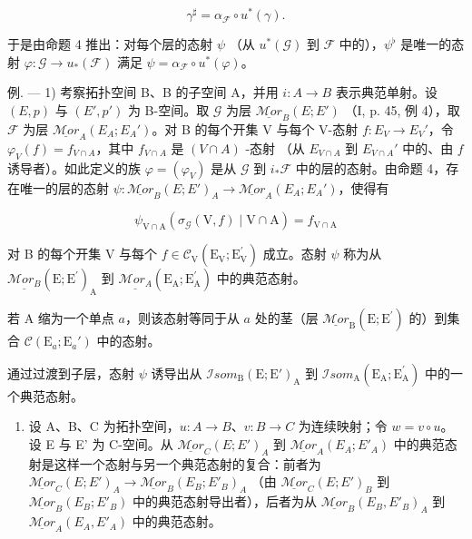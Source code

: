 \[
\gamma^ {\sharp} = \alpha_ {\mathcal {F}} \circ u ^ {*} (\gamma).
\]

于是由命题 4 推出：对每个层的态射 \(\psi\) （从 \(u^{*}(\mathcal{G})\) 到 \(\mathcal{F}\) 中的），\(\psi^{\flat}\) 是唯一的态射 \(\varphi\colon\mathcal{G}\to u_{*}(\mathcal{F})\) 满足 \(\psi=\alpha_{\mathcal{F}}\circ u^{*}(\varphi)\)。

例. --- 1) 考察拓扑空间 B、B 的子空间 A，并用 \(i\colon A \to B\) 表示典范单射。设 \((E,p)\) 与 \((E',p')\) 为 B-空间。取 \(\mathcal{G}\) 为层 \(\underline{\mathcal{M}or}_{B}(E;E')\) （I, p. 45, 例 4），取 \(\mathcal{F}\) 为层 \(\underline{\mathcal{M}or}_{A}(E_{A};E_{A}')\)。对 B 的每个开集 V 与每个 V-态射 \(f\colon E_{V} \to E_{V}'\)，令 \(\varphi_{V}(f) = f_{V \cap A}\)，其中 \(f_{V \cap A}\) 是 \((V \cap A)\) -态射 （从 \(E_{V \cap A}\) 到 \(E_{V \cap A}'\) 中的、由 \(f\) 诱导者）。如此定义的族 \(\varphi = (\varphi_{V})\) 是从 \(\mathcal{G}\) 到 \(i_*\mathcal{F}\) 中的层的态射。由命题 4，存在唯一的层的态射 \(\psi\colon \underline{\mathcal{M}or}_{B}(E;E')_{A} \to \underline{\mathcal{M}or}_{A}(E_{A};E_{A}')\)，使得有

\[
\psi_ {\mathrm{V} \cap \mathrm{A}} (\sigma_ {\mathcal {G}} (\mathrm{V}, f) \mid \mathrm{V} \cap \mathrm{A}) = f _ {\mathrm{V} \cap \mathrm{A}}\tag{12}
\]

对 B 的每个开集 V 与每个 \(f \in \mathcal{C}_{\mathrm{V}}(\mathrm{E}_{\mathrm{V}}; \mathrm{E}_{\mathrm{V}}^{\prime})\) 成立。态射 \(\psi\) 称为从 \(\underline{\mathcal{M}or_{B}}(\mathrm{E}; \mathrm{E}^{\prime})_{\mathrm{A}}\) 到 \(\underline{\mathcal{M}or_{A}}(\mathrm{E}_{\mathrm{A}}; \mathrm{E}_{\mathrm{A}}^{\prime})\) 中的典范态射。

若 A 缩为一个单点 \(a\)，则该态射等同于从 \(a\) 处的茎（层 \(\underline{\mathcal{M}or}_{\mathrm{B}}(\mathrm{E};\mathrm{E}^{\prime})\) 的）到集合 \(\mathcal{C}(\mathrm{E}_a;\mathrm{E}_a')\) 中的态射。

通过过渡到子层，态射 \(\psi\) 诱导出从 \(\mathcal{I}som_{\mathrm{B}}(\mathrm{E};\mathrm{E}')_{\mathrm{A}}\) 到 \(\mathcal{I}som_{\mathrm{A}}(\mathrm{E}_{\mathrm{A}};\mathrm{E}_{\mathrm{A}}^{\prime})\) 中的一个典范态射。

\begin{enumerate}
\def\labelenumi{\arabic{enumi})}
\setcounter{enumi}{1}
\tightlist
\item
  设 A、B、C 为拓扑空间，\(u\colon A\to B\)、\(v\colon B\to C\) 为连续映射；令 \(w=v\circ u\)。设 E 与 E' 为 C-空间。从 \(\underline{\mathcal{M}or}_{C}(E;E')_{A}\) 到 \(\underline{\mathcal{M}or}_{A}(E_{A};E'_{A})\) 中的典范态射是这样一个态射与另一个典范态射的复合：前者为 \(\underline{\mathcal{M}or}_{C}(E;E')_{A}\to\underline{\mathcal{M}or}_{B}(E_{B};E'_{B})_{A}\) （由 \(\underline{\mathcal{M}or}_{C}(E;E')_{B}\) 到 \(\underline{\mathcal{M}or}_{B}(E_{B};E'_{B})\) 中的典范态射导出者），后者为从 \(\underline{\mathcal{M}or}_{B}(E_{B},E'_{B})_{A}\) 到 \(\underline{\mathcal{M}or}_{A}(E_{A},E'_{A})\) 中的典范态射。
\end{enumerate}
\relax{}
